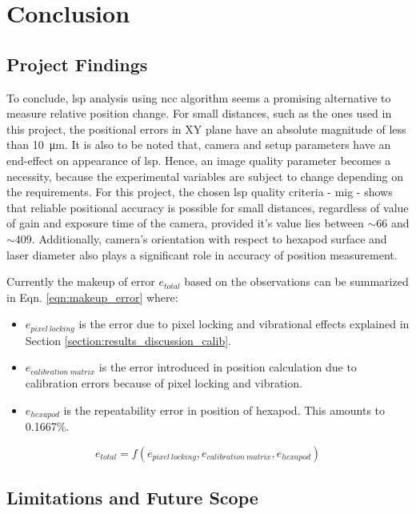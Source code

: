 \chapter{Conclusion}

\section*{Project Findings}

To conclude, \gls{lsp} analysis using \gls{ncc} algorithm seems a promising alternative to measure relative position change. For small distances, such as the ones used in this project, the positional errors in XY plane have an absolute magnitude of less than \SI{10}{\micro\meter}. It is also to be noted that, camera and setup parameters have an end-effect on appearance of \gls{lsp}. Hence, an image quality parameter becomes a necessity, because the experimental variables are subject to change depending on the requirements. For this project, the chosen \gls{lsp} quality criteria - \gls{mig} - shows that reliable positional accuracy is possible for small distances, regardless of value of gain and exposure time of the camera, provided it's value lies between $\sim66$ and $\sim409$. Additionally, camera's orientation with respect to hexapod surface and laser diameter also plays a significant role in accuracy of position measurement. 

\vspace{5mm}
\noindent Currently the makeup of error $e_{total}$ based on the observations can be summarized in Eqn. \ref{eqn:makeup_error} where:

\begin{itemize}
    \item $e_{pixel\ locking}$ is the error due to pixel locking and vibrational effects explained in Section \ref{section:results_discussion_calib}. 
    \item $e_{calibration\ matrix}$ is the error introduced in position calculation due to calibration errors because of pixel locking and vibration.
    \item $e_{hexapod}$ is the repeatability error in position of hexapod. This amounts to 0.1667\%.
\end{itemize}
\begin{equation}
    e_{total} = f(e_{pixel\ locking}, e_{calibration\ matrix}, e_{hexapod})
    \label{eqn:makeup_error}
\end{equation}

\section*{Limitations and Future Scope}  

